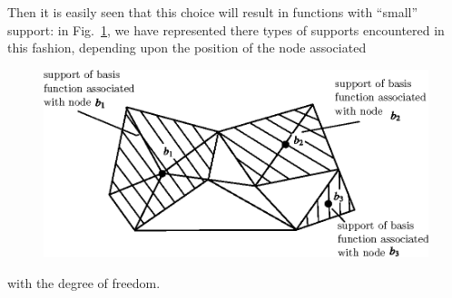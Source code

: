 Then it is easily seen that this choice will result in functions with
``small'' support: in Fig.~\ref{chap4-fig4.11}, we have represented
there types of supports encountered in this fashion, depending upon
the position of the node associated
\begin{figure}[H]
\centering
\includegraphics[scale=.9]{figure/fig4.11.eps}
\caption{}\label{chap4-fig4.11}
\end{figure}
\noindent
with the degree of freedom.

